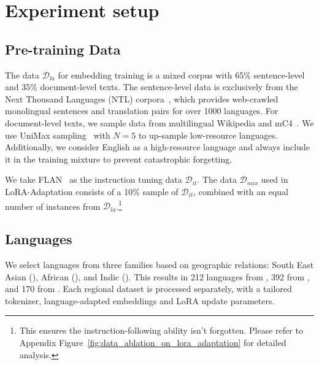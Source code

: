 \section{Experiment setup}
\subsection{Pre-training Data}
The data $\mathcal{D}_{la}$ for embedding training is a mixed corpus with 65\% sentence-level and 35\% document-level texts. The sentence-level data is exclusively from the Next Thousand Languages (NTL) corpora~\citep{caswell-etal-2020-language, bapna2022building}, which provides web-crawled monolingual sentences and translation pairs for over 1000 languages. For document-level texts, we sample data from multilingual Wikipedia and mC4~\citep{xue-etal-2021-mt5}. We use UniMax sampling~\citep{chung2023unimax} with $N=5$ to up-sample low-resource languages. Additionally, we consider English as a high-resource language and always include it in the training mixture to prevent catastrophic forgetting.

We take FLAN~\citep{wei2022finetuned} as the instruction tuning data $\mathcal{D}_{it}$. 
The data $\mathcal{D}_{mix}$ used in LoRA-Adaptation consists of a 10\% sample of $\mathcal{D}_{it}$, combined with an equal number of instances from $\mathcal{D}_{la}$.\footnote{This ensures the instruction-following ability isn't forgotten. Please refer to Appendix Figure~\ref{fig:data_ablation_on_lora_adaptation} for detailed analysis.}

\subsection{Languages}\label{sec:languages}
We select languages from three families based on geographic relations: South East Asian (\sea), African (\afr), and Indic (\ind). 
This results in 212 languages from \sea, 392 from \afr, and 170 from \ind. Each regional dataset is processed separately, with a tailored tokenizer, language-adapted embeddings and LoRA update parameters.

